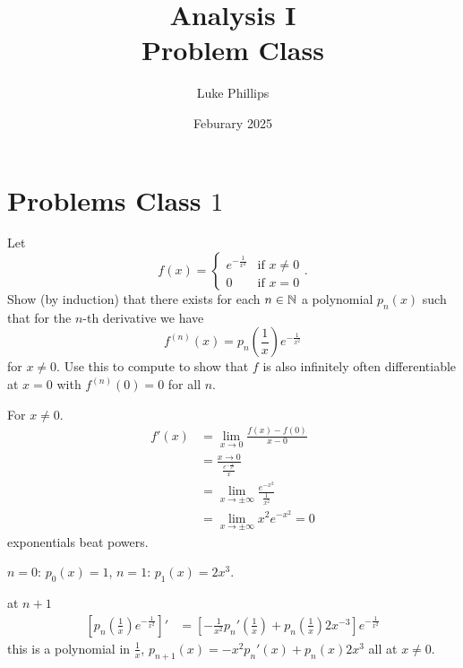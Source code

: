 \documentclass[10pt, a4paper]{article}
\title{Analysis I \\
    \large Problem Class}
\author{Luke Phillips}
\date{Feburary 2025}
\begin{document}
\maketitle

\newpage

\tableofcontents

\newpage

\section{Problems Class \texorpdfstring{$1$}{}}

\begin{problem}
    Let
    \[
    f(x) = \begin{cases}
        e ^ {-\frac{1}{x ^ 2}} & \text{if } x \neq 0 \\
        0 & \text{if } x = 0
    \end{cases}.
    \]
    Show
    (by induction)
    that there exists for each $n \in \mathbb{N}$ a polynomial $p_n(x)$ such that for the $n$-th derivative we have
    \[
    f ^ {(n)}(x) = p_n\left(\frac{1}{x}\right)e ^ {-\frac{1}{x ^ 2}}
    \]
    for $x \neq 0$.
    Use this to compute to show that $f$ is also infinitely often differentiable at $x = 0$ with $f ^ {(n)}(0) = 0$ for all $n$.

    \begin{solution}
        For $x \neq 0$.
        \begin{align*}
            f'(x) &= \lim_{x \rightarrow 0}\frac{f(x) - f(0)}{x - 0} \\
            &= \frac{x \rightarrow 0}{\frac{e ^ {-\frac{1}{x ^ 2}}}{x}} \\
            &= \lim_{x \rightarrow \pm\infty}\frac{e ^ {-x ^ 2}}{\frac{1}{x ^ 2}} \\
            &= \lim_{x \rightarrow \pm\infty}x ^ 2e ^ {-x ^ 2} = 0
        \end{align*}
        exponentials beat powers.

        $n = 0$:
        $p_0(x) = 1$,
        $n = 1$:
        $p_1(x) = 2x ^ 3$.

        at $n + 1$
        \begin{align*}
            \left[p_n\left(\frac{1}{x}\right)e ^ {-\frac{1}{x ^ 2}}\right]' &= \left[-\frac{1}{x ^ 2}p_n'\left(\frac{1}{x}\right) + p_n\left(\frac{1}{x}\right)2x ^ {-3}\right]e ^ {-\frac{1}{x ^ 2}}
        \end{align*}
        this is a polynomial in $\frac{1}{x}$,
        $p_{n + 1}(x) = -x ^ 2p_n'(x) + p_n(x)2x ^ 3$
        all at $x \neq 0$.


\end{solution}
\end{problem}
\end{document}
